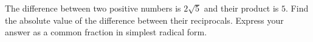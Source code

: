 The difference between two positive numbers is $2\sqrt5$ and their product is $5$. Find the absolute value of the difference between their reciprocals. Express your answer as a common fraction in simplest radical form.

